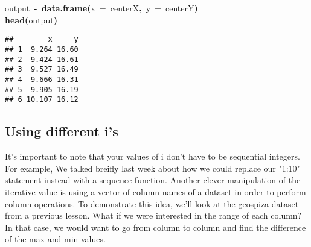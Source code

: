 \documentclass{article}\usepackage{graphicx, color}
\makeatletter
\newcommand{\hlfunctioncall}[1]{\textcolor[rgb]{0.501960784313725,0,0.329411764705882}{\textbf{#1}}}%
\newcommand{\hlkeyword}[1]{\textcolor[rgb]{0,0,0}{\textbf{#1}}}%
\newcommand{\hlargument}[1]{\textcolor[rgb]{0.690196078431373,0.250980392156863,0.0196078431372549}{#1}}%
\newcommand{\hlassignement}[1]{\textcolor[rgb]{0,0,0}{\textbf{#1}}}%
\newcommand{\hlsymbol}[1]{\textcolor[rgb]{0,0,0}{#1}}%
\newcommand{\hlstd}[1]{\textcolor[rgb]{0,0,0}{#1}}%
\newenvironment{kframe}{%
 \def\FrameCommand##1{\hskip\@totalleftmargin \hskip-\fboxsep
 \colorbox{shadecolor}{##1}\hskip-\fboxsep
     \hskip-\linewidth \hskip-\@totalleftmargin \hskip\columnwidth}%
 \MakeFramed {\advance\hsize-\width
   \@totalleftmargin\z@ \linewidth\hsize
   \@setminipage}}%
 {\par\unskip\endMakeFramed}
\newenvironment{knitrout}{}{} %
\makeatother
\begin{document}
\begin{knitrout}
\begin{kframe}
\begin{flushleft}
\hlstd{}\hlkeyword{\usebox{\hlnormalsizeboxclosebrace}}\hspace*{\fill}\\
\hlstd{}\hspace*{\fill}\\
\hlstd{}\hlsymbol{output}{\ }\hlassignement{\usebox{\hlnormalsizeboxlessthan}-}{\ }\hlfunctioncall{data.frame}\hlkeyword{(}\hlargument{x}{\ }\hlargument{=}{\ }\hlsymbol{centerX}\hlkeyword{,}{\ }\hlargument{y}{\ }\hlargument{=}{\ }\hlsymbol{centerY}\hlkeyword{)}\hspace*{\fill}\\
\hlstd{}\hlfunctioncall{head}\hlkeyword{(}\hlsymbol{output}\hlkeyword{)}\mbox{}
\normalfont
\end{flushleft}
\begin{verbatim}
##        x     y
## 1  9.264 16.60
## 2  9.424 16.61
## 3  9.527 16.49
## 4  9.666 16.31
## 5  9.905 16.19
## 6 10.107 16.12
\end{verbatim}
\end{kframe}
\end{knitrout}


\subsection{Using different i's}
It's important to note that your values of i don't have to be sequential integers. For example, We talked breifly last week about how we could replace our "1:10" statement instead with a sequence function. Another clever manipulation of the iterative value is using a vector of column names of a dataset in order to perform column operations. To demonstrate this idea, we'll look at the geospiza dataset from a previous lesson. What if we were interested in the range of each column? In that case, we would want to go from column to column and find the difference of the max and min values.
\end{document}
